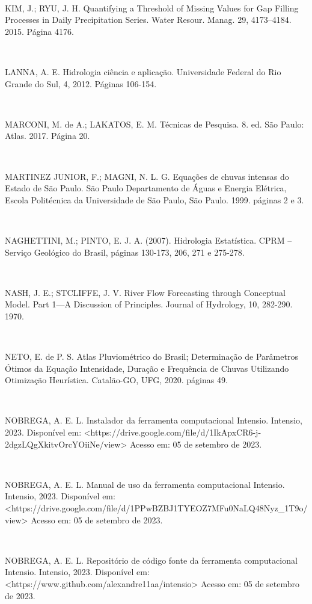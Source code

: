 \begin{flushleft}
\

KIM, J.; RYU, J. H. Quantifying a Threshold of Missing Values for Gap Filling Processes in Daily Precipitation Series. Water Resour. Manag. 29, 4173–4184. 2015. Página 4176.

\

LANNA, A. E. Hidrologia ciência e aplicação. Universidade Federal do Rio Grande do Sul, 4, 2012. Páginas 106-154.

\

MARCONI, M. de A.; LAKATOS, E. M. Técnicas de Pesquisa. 8. ed. São Paulo: Atlas. 2017. Página 20.

\

MARTINEZ JUNIOR, F.; MAGNI, N. L. G. Equações de chuvas intensas do Estado de São Paulo. São Paulo Departamento de Águas e Energia Elétrica, Escola Politécnica da Universidade de São Paulo, São Paulo. 1999. páginas 2 e 3.

\

NAGHETTINI, M.; PINTO, E. J. A. (2007). Hidrologia Estatística. CPRM – Serviço Geológico do Brasil, páginas 130-173, 206, 271 e 275-278.

\

NASH, J. E.; STCLIFFE, J. V. River Flow Forecasting through Conceptual Model. Part 1—A Discussion of Principles. Journal of Hydrology, 10, 282-290. 1970.

\

NETO, E. de P. S. Atlas Pluviométrico do Brasil; Determinação de Parâmetros Ótimos da Equação Intensidade, Duração e Frequência de Chuvas Utilizando Otimização Heurística. Catalão-GO, UFG, 2020. páginas 49.

\newpage

\

NOBREGA, A. E. L. Instalador da ferramenta computacional Intensio. Intensio, 2023. Disponível em: <https://drive.google.com/file/d/1IkApxCR6-j-2dgzLQgXkitvOrcYOiiNe/view> Acesso em: 05 de setembro de 2023.

\

NOBREGA, A. E. L. Manual de uso da ferramenta computacional Intensio. Intensio, 2023. Disponível em: <https://drive.google.com/file/d/1PPwBZBJ1TYEOZ7MFu0NaLQ48Nyz_1T9o/view> Acesso em: 05 de setembro de 2023.

\

NOBREGA, A. E. L. Repositório de código fonte da ferramenta computacional Intensio. Intensio, 2023. Disponível em: <https://www.github.com/alexandre11aa/intensio> Acesso em: 05 de setembro de 2023.


\end{flushleft}
